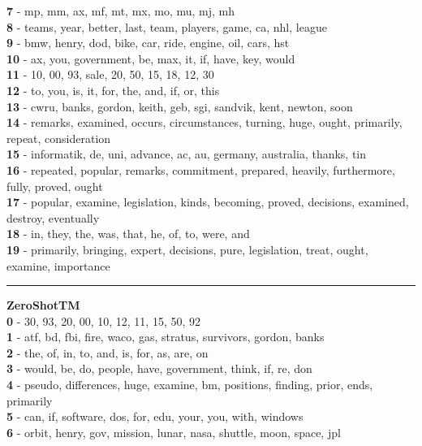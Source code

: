 \textbf{7} - mp, mm, ax, mf, mt, mx, mo, mu, mj, mh\\
\textbf{8} - teams, year, better, last, team, players, game, ca, nhl, league\\
\textbf{9} - bmw, henry, dod, bike, car, ride, engine, oil, cars, hst\\
\textbf{10} - ax, you, government, be, max, it, if, have, key, would\\
\textbf{11} - 10, 00, 93, sale, 20, 50, 15, 18, 12, 30\\
\textbf{12} - to, you, is, it, for, the, and, if, or, this\\
\textbf{13} - cwru, banks, gordon, keith, geb, sgi, sandvik, kent, newton, soon\\
\textbf{14} - remarks, examined, occurs, circumstances, turning, huge, ought, primarily, repeat, consideration\\
\textbf{15} - informatik, de, uni, advance, ac, au, germany, australia, thanks, tin\\
\textbf{16} - repeated, popular, remarks, commitment, prepared, heavily, furthermore, fully, proved, ought\\
\textbf{17} - popular, examine, legislation, kinds, becoming, proved, decisions, examined, destroy, eventually\\
\textbf{18} - in, they, the, was, that, he, of, to, were, and\\
\textbf{19} - primarily, bringing, expert, decisions, pure, legislation, treat, ought, examine, importance\\
\hrule\vspace{2mm}
\noindent
\textbf{ZeroShotTM}\vspace{2mm}\\
\vspace{2mm}
\noindent
\textbf{0} - 30, 93, 20, 00, 10, 12, 11, 15, 50, 92\\
\textbf{1} - atf, bd, fbi, fire, waco, gas, stratus, survivors, gordon, banks\\
\textbf{2} - the, of, in, to, and, is, for, as, are, on\\
\textbf{3} - would, be, do, people, have, government, think, if, re, don\\
\textbf{4} - pseudo, differences, huge, examine, bm, positions, finding, prior, ends, primarily\\
\textbf{5} - can, if, software, dos, for, edu, your, you, with, windows\\
\textbf{6} - orbit, henry, gov, mission, lunar, nasa, shuttle, moon, space, jpl\\
